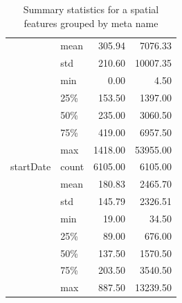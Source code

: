\begin{table}
\begin{center}
\begin{tabular}{llrr}
            & mean &     305.94 &    7076.33 \\
            & std &     210.60 &   10007.35 \\
            & min &       0.00 &       4.50 \\
            & 25\% &     153.50 &    1397.00 \\
            & 50\% &     235.00 &    3060.50 \\
            & 75\% &     419.00 &    6957.50 \\
            & max &    1418.00 &   53955.00 \\
startDate & count &    6105.00 &    6105.00 \\
            & mean &     180.83 &    2465.70 \\
            & std &     145.79 &    2326.51 \\
            & min &      19.00 &      34.50 \\
            & 25\% &      89.00 &     676.00 \\
            & 50\% &     137.50 &    1570.50 \\
            & 75\% &     203.50 &    3540.50 \\
            & max &     887.50 &   13239.50 \\
\bottomrule
\end{tabular}

\caption{Summary statistics for a spatial features grouped by meta name}
\label{table:spatialDistr}
\end{center}
\end{table}  


\label{append}